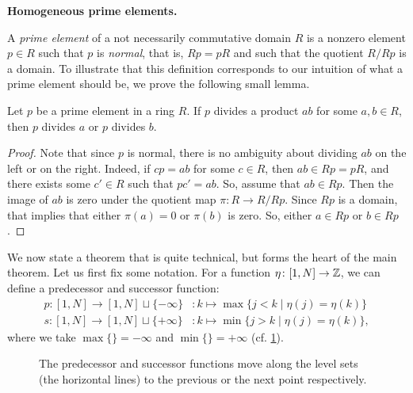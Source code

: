 \textbf{Homogeneous prime elements.}

A \emph{prime element} of a not necessarily commutative domain $R$
is a nonzero element $p \in R$ such that $p$ is \emph{normal},
that is, $Rp = pR$ and such that the quotient $R / Rp$ is a domain. To illustrate that
this definition corresponds to our intuition of what a prime element should be, we
prove the following small lemma.
\begin{lemma}\label{lem:prime_divides_product}
	Let $p$ be a prime element in a ring $R$. If $p$ divides a product $ab$ for some $a,b
		\in R$, then $p$ divides $a$ or $p$ divides $b$.
\end{lemma}
\begin{proof}
	Note that since $p$ is normal, there is no ambiguity about dividing $ab$ on the left or
	on the right. Indeed, if $c p = ab$ for some $c \in R$, then $ab \in Rp = pR$, and
	there exists some $c' \in R$ such that $p c' = ab$. So, assume that $ab \in Rp$. Then
	the image of $ab$ is zero under the quotient map $\pi \colon R \to R/Rp$. Since $Rp$ is
	a domain, that implies that either $\pi(a) = 0$ or $\pi(b)$ is zero. So, either $a \in
		Rp$ or $b \in Rp$.
\end{proof}
%
We now state a theorem that is quite technical, but forms the heart of the main
theorem. Let us first fix some notation. For a function $\eta \colon [1, N] \to \mathbb{Z}$,
we can define a predecessor and successor
function:
\begin{align*}
	p \colon [1, N] \to [1, N] \sqcup \{-\infty\} & \colon k \mapsto  \max\{j < k \mid \eta(j) = \eta(k)\}  \\
	s \colon [1, N] \to [1, N] \sqcup \{+\infty\} & \colon k \mapsto  \min\{j > k \mid \eta(j) = \eta(k)\},
\end{align*}
%
where we take $\max \{\} = - \infty$ and $\min \{\}= + \infty$ (cf.
\cref{fig:predecessor_successor}).

\begin{figure}
	\centering
	\caption{The predecessor and successor functions move along the level sets (the horizontal lines) to the previous or the next point respectively.}
	\label{fig:predecessor_successor}
\end{figure}

